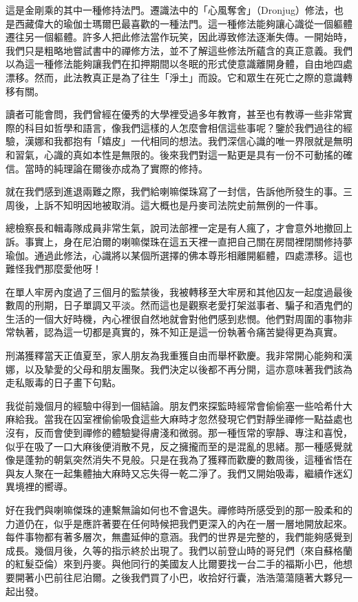 這是金剛乘的其中一種修持法門。遷識法中的「心風奪舍」（Dronjug）修法，也是西藏偉大的瑜伽士瑪爾巴最喜歡的一種法門。這一種修法能夠讓心識從一個軀體遷往另一個軀體。許多人把此修法當作玩笑，因此導致修法逐漸失傳。一開始時，我們只是粗略地嘗試書中的禪修方法，並不了解這些修法所蘊含的真正意義。我們以為這一種修法能夠讓我們在扣押期間以冬眠的形式使意識離開身體，自由地四處漂移。然而，此法教真正是為了往生「淨土」而設。它和眾生在死亡之際的意識轉移有關。

讀者可能會問，我們曾經在優秀的大學裡受過多年教育，甚至也有教導一些非常實際的科目如哲學和語言，像我們這樣的人怎麼會相信這些事呢？鑒於我們過往的經驗，漢娜和我都抱有「嬉皮」一代相同的想法。我們深信心識的唯一界限就是無明和習氣，心識的真如本性是無限的。後來我們對這一點更是具有一份不可動搖的確信。當時的純理論在爾後亦成為了實際的修持。

就在我們感到進退兩難之際，我們給喇嘛傑珠寫了一封信，告訴他所發生的事。三周後，上訴不知明因地被取消。這大概也是丹麥司法院史前無例的一件事。

總檢察長和輯毒隊成員非常生氣，說司法部裡一定是有人瘋了，才會意外地撤回上訴。事實上，身在尼泊爾的喇嘛傑珠在這五天裡一直把自己關在房間裡閉關修持夢瑜伽。通過此修法，心識將以某個所選擇的佛本尊形相離開軀體，四處漂移。這也難怪我們那麼愛他呀！

在單人牢房內度過了三個月的監禁後，我被轉移至大牢房和其他囚友一起度過最後數周的刑期，日子單調又平淡。然而這也是觀察老愛打架滋事者、騙子和酒鬼們的生活的一個大好時機，內心裡很自然地就會對他們感到悲憫。他們對周圍的事物非常執著，認為這一切都是真實的，殊不知正是這一份執著令痛苦變得更為真實。

刑滿獲釋當天正值夏至，家人朋友為我重獲自由而舉杯歡慶。我非常開心能夠和漢娜，以及摯愛的父母和朋友團聚。我們決定以後都不再分開，這亦意味著我們該為走私販毒的日子畫下句點。

我從前幾個月的經驗中得到一個結論。朋友們來探監時經常會偷偷塞一些哈希什大麻給我。當我在囚室裡偷偷吸食這些大麻時才忽然發現它們對靜坐禪修一點益處也沒有，反而會使到禪修的體驗變得膚淺和微弱。那一種恆常的寧靜、專注和喜悅，似乎在吸了一口大麻後便消散不見，反之擁攏而至的是混亂的思緒。那一種感覺就像是蓬勃的朝氣突然消失不見般。只是在我為了獲釋而歡慶的數周後，這種省悟在與友人聚在一起集體抽大麻時又忘失得一乾二淨了。我們又開始吸毒，繼續作迷幻異境裡的嚮導。

好在我們與喇嘛傑珠的連繫無論如何也不會退失。禪修時所感受到的那一股柔和的力道仍在，似乎是應許著要在任何時候把我們更深入的內在一層一層地開放起來。每件事物都有著多層次，無盡延伸的意涵。我們的世界是完整的，我們能夠感覺到成長。幾個月後，久等的指示終於出現了。我們以前登山時的哥兒們（來自蘇格蘭的紅髮亞倫）來到丹麥。與他同行的美國友人比爾要找一台二手的福斯小巴，他想要開著小巴前往尼泊爾。之後我們買了小巴，收拾好行囊，浩浩蕩蕩隨著大夥兒一起出發。
